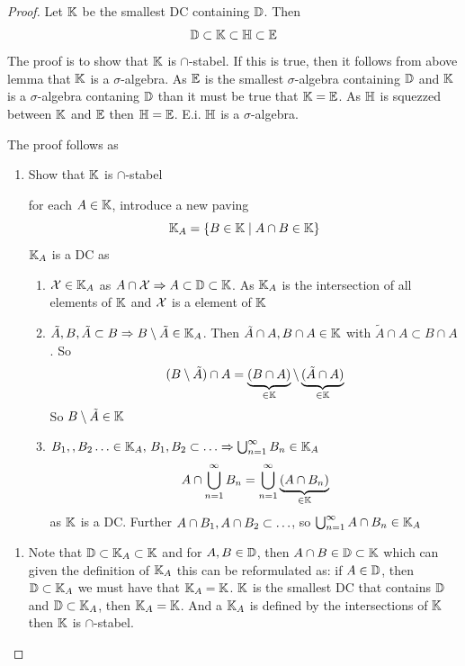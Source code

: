 \begin{proof}
Let \({\mathbb{K}}\) be the smallest DC containing \({\mathbb{D}}\). Then
\[
  {\mathbb{D}}\subset{\mathbb{K}}\subset{\mathbb{H}}\subset{\mathbb{E}}
\]
The proof is to show that \({\mathbb{K}}\) is \(\cap\)-stabel. If this is true, then it follows from above lemma that \({\mathbb{K}}\) is a \(\sigma\)-algebra. As \({\mathbb{E}}\) is the smallest \(\sigma\)-algebra containing \({\mathbb{D}}\) and \({\mathbb{K}}\) is a \(\sigma\)-algebra contaning \({\mathbb{D}}\) than it must be true that \({\mathbb{K}}={\mathbb{E}}\). As \({\mathbb{H}}\) is squezzed between \({\mathbb{K}}\) and \({\mathbb{E}}\) then \({\mathbb{H}}={\mathbb{E}}\). E.i. \({\mathbb{H}}\) is a \(\sigma\)-algebra.

The proof follows as
\begin{enumerate}
  \item Show that \({\mathbb{K}}\) is \(\cap\)-stabel

for each \(A\in{\mathbb{K}}\), introduce a new paving
\[
  {\mathbb{K}}_A=\left\{ B\in{\mathbb{K}}\mid A\cap B\in {\mathbb{K}}\right\}
\]
\({\mathbb{K}}_A\) is a DC as
\begin{enumerate}[label=(\alph*)]
  \item \({\mathcal{X}}\in{\mathbb{K}}_A\) as \(A\cap{\mathcal{X}} \Rightarrow A\subset{\mathbb{D}}\subset{\mathbb{K}}\). As \({\mathbb{K}}_A\) is the intersection of all elements of \({\mathbb{K}}\) and \({\mathcal{X}}\) is a element of \({\mathbb{K}}\)
  \item \(\tilde{A},B,\tilde{A}\subset B \Rightarrow B\setminus\tilde{A}\in{\mathbb{K}}_A\). Then \(\tilde{A}\cap A, B\cap A\in {\mathbb{K}}\) with \(\tilde{A}\cap A\subset B\cap A \). So
  \[
    (B\setminus\tilde{A})\cap A=\underbrace{(B\cap A)}_{\in{\mathbb{K}}}\setminus \underbrace{(\tilde{A}\cap A)}_{\in{\mathbb{K}}}
  \]
So \(B\setminus\tilde{A}\in{\mathbb{K}}\)
\item \(B_1,,B_2\ldots\in{\mathbb{K}}_A,\, B_1, B_2 \subset \ldots \Rightarrow \bigcup_{n=1}^\infty B_n \in{\mathbb{K}}_A\)
\[
  A\cap \bigcup_{n=1}^\infty B_n=\bigcup_{n=1}^\infty\underbrace{(A\cap B_n)}_{\in{\mathbb{K}}}
\]
as \({\mathbb{K}}\) is a DC. Further \(A\cap B_1, A\cap B_2 \subset \ldots\), so \(\bigcup_{n=1}^\infty A\cap B_n\in{\mathbb{K}}_A\)
\end{enumerate}
\end{enumerate}
\begin{enumerate}[resume]
  \item Note that \({\mathbb{D}}\subset{\mathbb{K}}_A\subset{\mathbb{K}}\) and for \(A,B\in{\mathbb{D}}\), then \(A\cap B\in{\mathbb{D}}\subset {\mathbb{K}}\) which can given the definition of \({\mathbb{K}}_A\) this can be reformulated as: if \(A\in{\mathbb{D}}\), then \({\mathbb{D}}\subset{\mathbb{K}}_A\) we must have that \({\mathbb{K}}_A={\mathbb{K}}\). \({\mathbb{K}}\) is the smallest DC that contains \({\mathbb{D}}\) and \({\mathbb{D}}\subset{\mathbb{K}}_A\), then \({\mathbb{K}}_A={\mathbb{K}}\). And a \({\mathbb{K}}_A\) is defined by the intersections of \({\mathbb{K}}\) then \({\mathbb{K}}\) is \(\cap\)-stabel.
\end{enumerate}
\begin{figure}[htbp]

\end{figure}
\end{proof}
